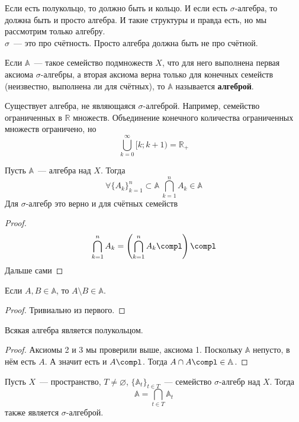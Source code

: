 \documentclass{article}
\begin{document}
    \begin{remark}
        Если есть полукольцо, то должно быть и кольцо. И если есть $\sigma$-алгебра, то должна быть и просто алгебра. И такие структуры и правда есть, но мы рассмотрим только алгебру.\\
        $\sigma$~--- это про счётность. Просто алгебра должна быть не про счётной.
    \end{remark}
    \begin{definition}
        Если $\mathbb A$~--- такое семейство подмножеств $X$, что для него выполнена первая аксиома $\sigma$-алгебры, а вторая аксиома верна только для конечных семейств (неизвестно, выполнена ли для счётных), то $\mathbb A$ называется \textbf{алгеброй}.
    \end{definition}
    \begin{example}
        Существует алгебра, не являющаяся $\sigma$-алгеброй. Например, семейство ограниченных в $\mathbb R$ множеств. Объединение конечного количества ограниченных множеств ограничено, но
        $$
        \bigcup\limits_{k=0}^\infty [k;k+1)=\mathbb R_+
        $$
    \end{example}
    \begin{property}
        Пусть $\mathbb A$~--- алгебра над $X$. Тогда
        $$
        \forall\{A_k\}_{k=1}^n\subset\mathbb A~\bigcap\limits_{k=1}^nA_k\in\mathbb A
        $$
        Для $\sigma$-алгебр это верно и для счётных семейств
    \end{property}
    \begin{proof}
        $$
        \bigcap\limits_{k=1}^nA_k=\left(\bigcap\limits_{k=1}^nA_k\compl\right)\compl
        $$
        Дальше сами
    \end{proof}
    \begin{property}
        Если $A,B\in\mathbb A$, то $A\setminus B\in\mathbb A$.
    \end{property}
    \begin{proof}
        Тривиально из первого.
    \end{proof}
    \begin{property}
        Всякая алгебра является полукольцом.
    \end{property}
    \begin{proof}
        Аксиомы 2 и 3 мы проверили выше, аксиома 1. Поскольку $\mathbb A$ непусто, в нём есть $A$. А значит есть и $A\compl$. Тогда $A\cap A\compl\in\mathbb A$.
    \end{proof}
    \begin{claim}
        Пусть $X$~--- пространство, $T\neq\varnothing$, $\{\mathbb A_t\}_{t\in T}$~--- семейство $\sigma$-алгебр над $X$. Тогда
        $$
        \mathbb A=\bigcap_{t\in T}\mathbb A_t
        $$
        также является $\sigma$-алгеброй.
    \end{claim}
\end{document}
